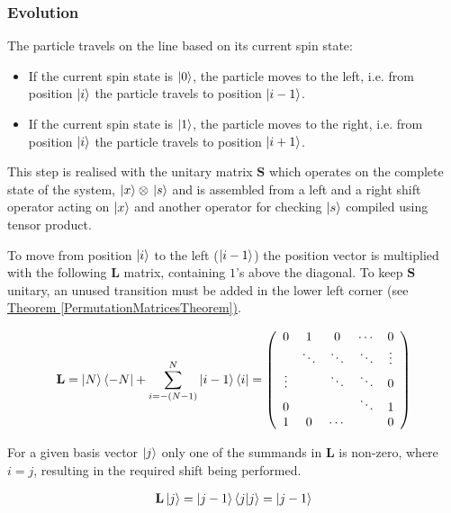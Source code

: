 \subsubsection{Evolution}

The particle travels on the line based on its current spin state:
\begin{itemize}
\item If the current spin state is $\ket{0}$, the particle moves to the left, i.e. from position $\ket{i}$ the particle travels to position $\ket{i-1}$.
\item If the current spin state is $\ket{1}$, the particle moves to the right, i.e. from position $\ket{i}$ the particle travels to position $\ket{i+1}$.
\end{itemize}

This step is realised with the unitary matrix $\mathbf{S}$ which operates on the complete state of the system, $\ket{x}\otimes{}\ket{s}$ and is assembled from a left and a right shift operator acting on $\ket{x}$ and another operator for checking $\ket{s}$ compiled using tensor product.

\begin{definition}

To move from position $\ket{i}$ to the left ($\ket{i-1}$) the position vector is multiplied with the following $\mathbf{L}$ matrix, containing $1$'s above the diagonal. To keep $\mathbf{S}$ unitary, an unused transition must be added in the lower left corner (see \hyperref[PermutationMatricesTheorem]{Theorem \ref{PermutationMatricesTheorem})}.

\begin{align}
\label{LeftShift}
\mathbf{L} = \ket{N}\bra{-N} + \sum\limits_{i=-(N-1)}^{N} \ket{i-1}\bra{i} =
\left(
    \begin{array}{ccccc}
        0      & 1      & 0      & \cdots & 0      \\
               & \ddots & \ddots & \ddots & \vdots \\
        \vdots &        & \ddots & \ddots & 0      \\
        0      &        &        & \ddots & 1      \\
        1      & 0      & \cdots &        & 0
      \end{array}
\right)
\end{align}

For a given basis vector $\ket{j}$ only one of the summands in $\mathbf{L}$ is non-zero, where $i=j$, resulting in the required shift being performed.

\begin{align*}
\mathbf{L}\ket{j} = \ket{j-1}\bra{j}\ket{j} = \ket{j-1}
\end{align*}

\end{definition}

